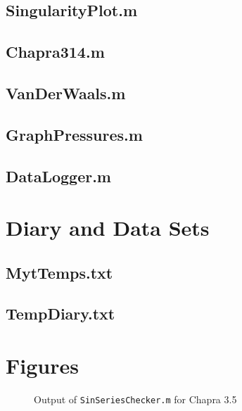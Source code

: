 \documentclass{article}
\begin{document}
\subsection{SingularityPlot.m}
\clearpage

\subsection{Chapra314.m}

\subsection{VanDerWaals.m}
\clearpage

\subsection{GraphPressures.m}

\subsection{DataLogger.m}
\clearpage

\section{Diary and Data Sets}

\subsection{MytTemps.txt}

\subsection{TempDiary.txt}

\clearpage %

\section{Figures}

\begin{figure}[htb!]
\begin{center}
\caption{Output of {\tt SinSeriesChecker.m} for Chapra 3.5}
\end{center}
\end{figure}
\end{document}
